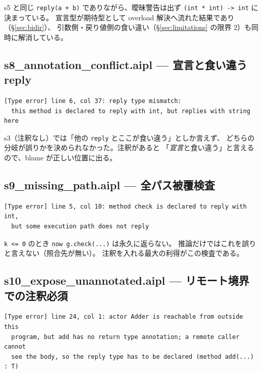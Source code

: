 \documentclass[11pt,a4paper]{ltjsarticle}
\theoremstyle{definition}
\theoremstyle{remark}
\begin{document}
s5 と同じ \texttt{reply(a + b)} でありながら、曖昧警告は出ず
\texttt{(int * int) -> int} に決まっている。
宣言型が期待型として overload 解決へ流れた結果であり（\S\ref{sec:bidir}）、
引数側・戻り値側の食い違い（\S\ref{sec:limitations} の限界 2）も同時に解消している。

\subsection{s8\_annotation\_conflict.aipl --- 宣言と食い違う reply}



\begin{lstlisting}[language={}]
[Type error] line 6, col 37: reply type mismatch:
  this method is declared to reply with int, but replies with string here
\end{lstlisting}

s3（注釈なし）では「他の \texttt{reply} とここが食い違う」としか言えず、
どちらの分岐が誤りかを決められなかった。注釈があると
「\emph{宣言}と食い違う」と言えるので、blame が正しい位置に出る。

\subsection{s9\_missing\_path.aipl --- 全パス被覆検査}



\begin{lstlisting}[language={}]
[Type error] line 5, col 10: method check is declared to reply with int,
  but some execution path does not reply
\end{lstlisting}

\texttt{k <= 0} のとき \texttt{now g.check(...)} は永久に返らない。
推論だけではこれを誤りと言えない（照合先が無い）。
注釈を入れる最大の利得がこの検査である。

\subsection{s10\_expose\_unannotated.aipl --- リモート境界での注釈必須}



\begin{lstlisting}[language={}]
[Type error] line 24, col 1: actor Adder is reachable from outside this
  program, but add has no return type annotation; a remote caller cannot
  see the body, so the reply type has to be declared (method add(...) : T)
\end{lstlisting}
\end{document}
